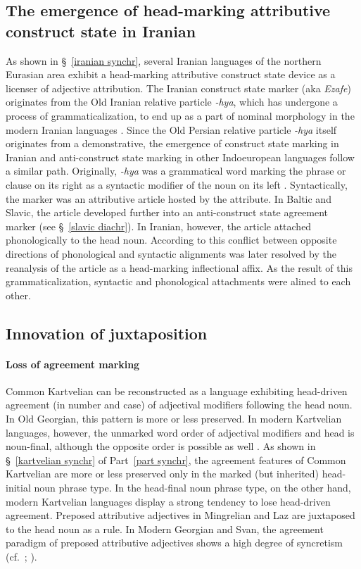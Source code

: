 {\subsection[Head-marking attributive construct state]{The emergence of head-marking attributive construct state in Iranian}\label{iranian diachr}
As shown in \S~\ref{iranian synchr}, several Iranian languages of the northern Eurasian area exhibit a head-marking attributive construct state device as a licenser of adjective attribution. The Iranian construct state marker (aka \textit{Ezafe}) originates from the Old Iranian relative particle \textit{-hya}, which has undergone a process of grammaticalization, to end up as a part of nominal morphology in the modern Iranian languages \citep{haider-etal1984,samvelian2007b}. Since the Old Persian relative particle \textit{-hya} itself originates from a demonstrative, the emergence of construct state marking in Iranian and anti-construct state marking in other Indoeuropean languages follow a similar path. Originally, \textit{-hya} was a grammatical word marking the phrase or clause on its right as a syntactic modifier of the noun on its left \citep{haider-etal1984}. Syntactically, the marker was an attributive article hosted by the attribute. In Baltic and Slavic, the article developed further into an anti-construct state agreement marker (see \S~\ref{slavic diachr}). In Iranian, however, the article attached phonologically to the head noun. According to \citet[3]{samvelian2007} this conflict between opposite directions of phonological and syntactic alignments was later resolved by the reanalysis of the article as a head-marking inflectional affix. As the result of this grammaticalization, syntactic and phonological attachments were alined to each other.

\subsection[Innovation of juxtaposition]{Innovation of juxtaposition}
\paragraph{Loss of agreement marking}
Common Kartvelian can be reconstructed as a language exhibiting head-driven agreement (in number and case) of adjectival modifiers following the head noun. In Old Georgian, this pattern is more or less preserved. In modern Kartvelian languages, however, the unmarked word order of adjectival modifiers and head is noun-final, although the opposite order is possible as well \cite[56]{harris1991a}. As shown in \S~\ref{kartvelian synchr} of Part~\ref{part synchr}, the agreement features of Common Kartvelian are more or less preserved only in the marked (but inherited) head-initial noun phrase type. In the head-final noun phrase type, on the other hand, modern Kartvelian languages display a strong tendency to lose head-driven agreement. Preposed attributive adjectives in Mingrelian and Laz are juxtaposed to the head noun as a rule. In Modern Georgian and Svan, the agreement paradigm of preposed attributive adjectives shows a high degree of syncretism (cf.~\citealt[56]{harris1991a}; \citealt[56–60, elsewhere]{tuite1998}).

}
